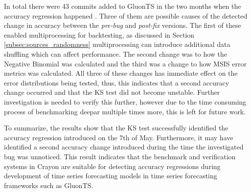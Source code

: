 In total there were 43 commits added to GluonTS in the two months when the accuracy regression happened \cite{gluonts-github}. Three of them are possible causes of the detected change in accuracy between the \textit{pre-bug} and \textit{post-fix} versions. The first of these enabled multiprocessing for backtesting, as discussed in Section \ref{subsec:sources_randomness} multiprocessing can introduce additional data shuffling which can affect performance. The second change was to how the Negative Binomial was calculated and the third was a change to how MSIS error metrics was calculated. All three of these changes has immediate effect on the error distributions being tested, thus, this indicates that a second accuracy change occurred and that the KS test did not become unstable. Further investigation is needed to verify this further, however due to the time consuming process of benchmarking deepar multiple times more, this is left for future work.

To summarize, the results show that the KS test successfully identified the accuracy regression introduced on the 7th of May. Furthermore, it may have identified a second accuracy change introduced during the time the investigated bug was unnoticed. This result indicates that the benchmark and verification systems in Crayon are suitable for detecting accuracy regressions during development of time series forecasting models in time series forecasting frameworks such as GluonTS.






